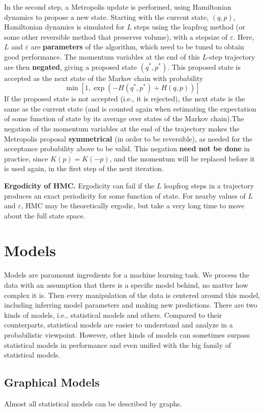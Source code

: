 \documentclass[a4paper]{report}
\begin{document}
In the second step, a Metropolis update is performed, using Hamiltonian dynamics to propose
a new state. Starting with the current state, $(q, p)$, Hamiltonian dynamics is simulated
for $L$ steps using the leapfrog method (or some other reversible method that preserves volume),
with a stepsize of $\varepsilon$. Here, $L$ and $\varepsilon$ are \textbf{parameters} of the algorithm, which need to be
tuned to obtain good performance. The momentum variables at the end of this $L$-step trajectory are then \textbf{negated}, giving a proposed state $(q^*,p^*)$. This proposed state is accepted as the next state of the Markov chain with probability
\begin{equation}
	\min \left[ 1, \exp(- H(q^*,p^*) + H(q,p)) \right]
\end{equation}
If the proposed state is not accepted (i.e., it is rejected), the next state is the same as the
current state (and is counted again when estimating the expectation of some function of state
by its average over states of the Markov chain).The negation of the momentum variables
at the end of the trajectory makes the Metropolis proposal \textbf{symmetrical} (in order to be reversible), as needed for the
acceptance probability above to be valid. This negation \textbf{need not be done} in practice, since
$K(p) = K(-p)$, and the momentum will be replaced before it is used again, in the first step
of the next iteration. 

\textbf{Ergodicity of HMC.} Ergodicity can fail if the $L$ leapfrog steps in a trajectory produces an exact periodicity for some function of state. For nearby values of $L$ and $\varepsilon$, HMC may be theoretically ergodic, but take a very
long time to move about the full state space.
\chapter{Models}
Models are paramount ingredients for a machine learning task. We process the data with an assumption that there is a specific model behind, no matter how complex it is. Then every manipulation of the data is centered around this model, including inferring model parameters and making new predictions. There are two kinds of models, i.e., statistical models and others. Compared to their counterparts, statistical models are easier to understand and analyze in a probabilistic viewpoint. However, other kinds of models can sometimes surpass statistical models in performance and even unified with the big family of statistical models.
\section{Graphical Models}
Almost all statistical models can be described by graphs.
\end{document}
